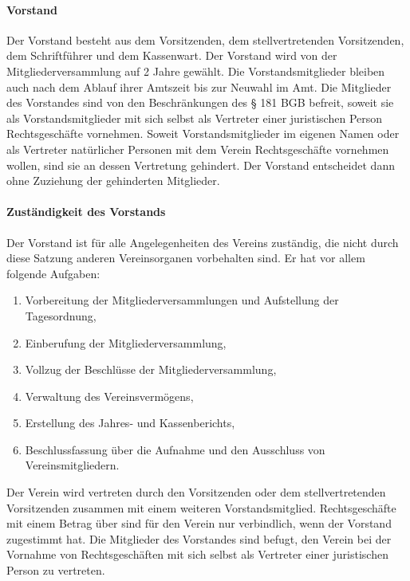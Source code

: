\begin{multicols}{2}
\paragraph{Vorstand}
Der Vorstand besteht aus dem Vorsitzenden, dem stellvertretenden
Vorsitzenden, dem Schriftführer und dem Kassenwart. Der Vorstand wird
von der Mitgliederversammlung auf 2 Jahre gewählt. Die
Vorstandsmitglieder bleiben auch nach dem Ablauf ihrer Amtszeit bis zur
Neuwahl im Amt. Die Mitglieder des Vorstandes sind von den
Beschränkungen des § 181 BGB befreit, soweit sie als Vorstandsmitglieder
mit sich selbst als Vertreter einer juristischen Person Rechtsgeschäfte
vornehmen. Soweit Vorstandsmitglieder im eigenen Namen oder als
Vertreter natürlicher Personen mit dem Verein Rechtsgeschäfte vornehmen
wollen, sind sie an dessen Vertretung gehindert. Der Vorstand entscheidet
dann ohne Zuziehung der gehinderten Mitglieder.
\paragraph{Zuständigkeit des Vorstands}
Der Vorstand ist für alle Angelegenheiten des Vereins zuständig, die nicht
durch diese Satzung anderen Vereinsorganen vorbehalten sind.
Er hat vor allem folgende Aufgaben:

\begin{enumerate}
\setlength{\itemsep}{-2pt}
\item Vorbereitung der Mitgliederversammlungen und Aufstellung der
Tagesordnung,
\item Einberufung der Mitgliederversammlung,
\item Vollzug der Beschlüsse der Mitgliederversammlung,
\item Verwaltung des Vereinsvermögens,
\item Erstellung des Jahres- und Kassenberichts,
\item Beschlussfassung über die Aufnahme und den Ausschluss von Vereinsmitgliedern.
\end{enumerate}

Der Verein wird vertreten durch den Vorsitzenden oder dem stellvertretenden Vorsitzenden zusammen mit einem weiteren Vorstandsmitglied. Rechtsgeschäfte mit einem Betrag über  sind für den Verein nur verbindlich, wenn der Vorstand zugestimmt hat. Die Mitglieder des Vorstandes sind befugt, den Verein bei der Vornahme von Rechtsgeschäften mit sich selbst als Vertreter einer juristischen Person zu vertreten.


\end{multicols}

